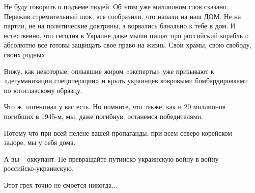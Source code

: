 Не буду говорить о подъеме людей. Об этом уже миллионом слов сказано. Пережив
стремительный шок, все сообразили, что напали на наш ДОМ. Не на партии, не на
политические доктрины, а ворвались банально к тебе в дом. И естественно, что
сегодня в Украине даже мыши пищат про российский корабль и абсолютно все готовы
защищать свое право на жизнь. Свои храмы, свою свободу, своих родных.

Вижу, как некоторые, оплывшие жиром «эксперты» уже призывают к «дегуманизации
спецоперации» и крыть украинцев ковровыми бомбардировками по югославскому
образцу.

Что ж, потенциал у вас есть. Но помните, что также, как и 20 миллионов погибших
в 1945-м, мы, даже погибнув, останемся победителями.

Потому что при всей пелене вашей пропаганды, при всем северо-корейском задоре,
мы у себя дома.

А вы – оккупант. Не превращайте путинско-украинскую войну в войну
российско-украинскую. 

Этот грех точно не смоется никогда...

